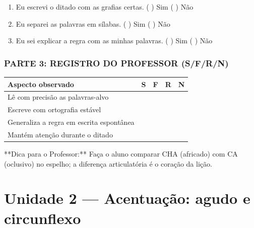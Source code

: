 \begin{exercicio}
\begin{enumerate}[label=\alph*)]
  \item Eu escrevi o ditado com as grafias certas.  \quad ( ) Sim   ( ) Não

  \item Eu separei as palavras em sílabas.  \quad ( ) Sim   ( ) Não

  \item Eu sei explicar a regra com as minhas palavras.  \quad ( ) Sim   ( ) Não

\end{enumerate}

\subsection*{PARTE 3: REGISTRO DO PROFESSOR (S/F/R/N)}

\begin{center}
\renewcommand{\arraystretch}{1.4}
\begin{tabular}{@{}p{9cm}cccc@{}}
\toprule
Aspecto observado & S & F & R & N \\
\midrule
Lê com precisão as palavras-alvo & & & & \\
Escreve com ortografia estável & & & & \\
Generaliza a regra em escrita espontânea & & & & \\
Mantém atenção durante o ditado & & & & \\
\bottomrule\end{tabular}\end{center}

\end{exercicio}

\begin{dica}
**Dica para o Professor:** Faça o aluno comparar CHA (africado) com CA (oclusivo) no espelho; a diferença articulatória é o coração da lição.
\end{dica}



\chapter{Unidade 2 --- Acentuação: agudo e circunflexo}


